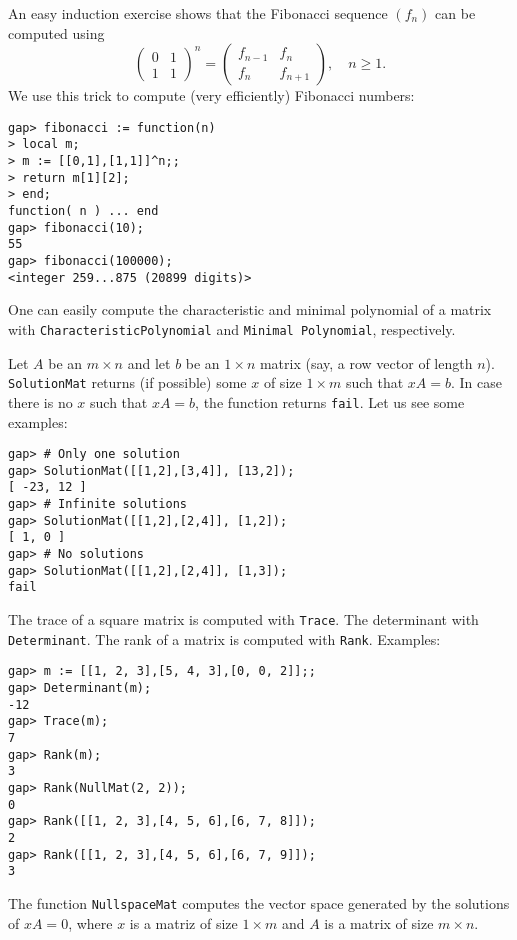 \begin{example}
An easy induction exercise shows that the Fibonacci sequence $(f_n)$ 
can be computed using 
\[
    \begin{pmatrix}
        0 & 1\\
        1 & 1
    \end{pmatrix}^n=\begin{pmatrix}
        f_{n-1} & f_n\\
        f_n & f_{n+1}
    \end{pmatrix},\quad n\geq1. 
\]
We use this trick to compute (very efficiently) Fibonacci numbers: 
\begin{lstlisting}
gap> fibonacci := function(n)
> local m;
> m := [[0,1],[1,1]]^n;;
> return m[1][2];
> end;
function( n ) ... end
gap> fibonacci(10);
55
gap> fibonacci(100000);
<integer 259...875 (20899 digits)>
\end{lstlisting}
\end{example}

One can easily compute the characteristic and minimal polynomial of a matrix
with \lstinline{CharacteristicPolynomial} and \lstinline{Minimal Polynomial},
respectively.

Let $A$ be an $m\times n$ and let $b$ be an $1\times n$ matrix (say, a row
vector of length $n$).  \lstinline{SolutionMat} returns (if possible) some $x$
of size $1\times m$ such that $xA=b$. In case there is no $x$ such that $xA=b$,
the function returns  \lstinline{fail}. Let us see some examples:
\begin{lstlisting}
gap> # Only one solution
gap> SolutionMat([[1,2],[3,4]], [13,2]);
[ -23, 12 ]
gap> # Infinite solutions
gap> SolutionMat([[1,2],[2,4]], [1,2]);
[ 1, 0 ]
gap> # No solutions
gap> SolutionMat([[1,2],[2,4]], [1,3]);
fail
\end{lstlisting}

The trace of a square matrix is computed with \lstinline{Trace}. The
determinant with \lstinline{Determinant}. The rank of a matrix is computed with
\lstinline{Rank}. Examples:
\begin{lstlisting}
gap> m := [[1, 2, 3],[5, 4, 3],[0, 0, 2]];;
gap> Determinant(m);
-12
gap> Trace(m);
7
gap> Rank(m);
3
gap> Rank(NullMat(2, 2));
0
gap> Rank([[1, 2, 3],[4, 5, 6],[6, 7, 8]]);
2
gap> Rank([[1, 2, 3],[4, 5, 6],[6, 7, 9]]);
3
\end{lstlisting}
The function \lstinline{NullspaceMat} computes the vector space generated by
the solutions of $xA=0$, where $x$ is a matriz of size $1\times m$ and $A$ is a
matrix of size $m\times n$. 

